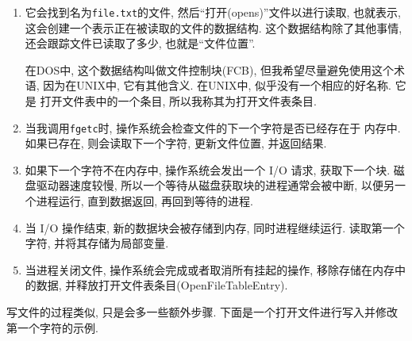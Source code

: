 \documentclass[12pt]{book}
\begin{document}
{\begin{enumerate}
\item 它会找到名为{\tt file.txt}的文件, 然后``打开(opens)''文件以进行读取,
  也就表示, 这会创建一个表示正在被读取的文件的数据结构.
  这个数据结构除了其他事情, 还会跟踪文件已读取了多少, 也就是``文件位置''.
  
  在DOS中, 这个数据结构叫做文件控制块(FCB), 但我希望尽量避免使用这个术语,
  因为在UNIX中, 它有其他含义. 在UNIX中, 似乎没有一个相应的好名称. 它是
  打开文件表中的一个条目, 所以我称其为打开文件表条目.

%
%
%
\item 当我调用{\tt fgetc}时, 操作系统会检查文件的下一个字符是否已经存在于
  内存中. 如果已存在, 则会读取下一个字符, 更新文件位置, 并返回结果.

\item 如果下一个字符不在内存中, 操作系统会发出一个 I/O 请求, 获取下一个块.
  磁盘驱动器速度较慢, 所以一个等待从磁盘获取块的进程通常会被中断, 以便另一个进程运行,
  直到数据返回, 再回到等待的进程.

\item 当 I/O 操作结束, 新的数据块会被存储到内存, 同时进程继续运行. 读取第一个字符,
  并将其存储为局部变量.

\item 当进程关闭文件, 操作系统会完成或者取消所有挂起的操作, 移除存储在内存中的数据,
  并释放打开文件表条目(OpenFileTableEntry).

\end{enumerate}
写文件的过程类似, 只是会多一些额外步骤. 
下面是一个打开文件进行写入并修改第一个字符的示例.

}
\end{document}
